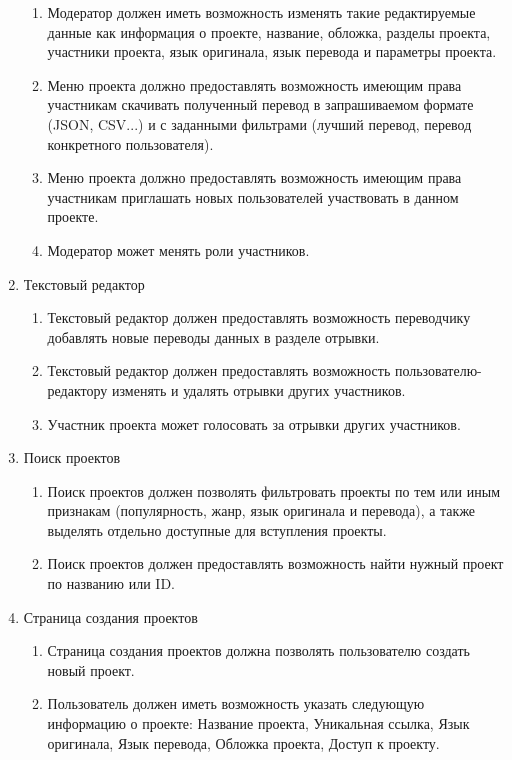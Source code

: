 \documentclass[a4paper,12pt]{article}
\begin{document}
\begin{enumerate}
\begin{enumerate}
	\item Модератор должен иметь возможность изменять такие редактируемые данные как информация о проекте, название, обложка, разделы проекта, участники проекта, язык оригинала, язык перевода и параметры проекта.
	\item Меню проекта должно предоставлять возможность имеющим права участникам скачивать полученный перевод в запрашиваемом формате (JSON, CSV...) и с заданными фильтрами (лучший перевод, перевод конкретного пользователя).
	\item Меню проекта должно предоставлять возможность имеющим права участникам приглашать новых пользователей участвовать в данном проекте.
	\item Модератор может менять роли участников.
\end{enumerate}
\item Текстовый редактор
\begin{enumerate}
	\item Текстовый редактор должен предоставлять возможность переводчику добавлять новые переводы данных в разделе отрывки.
	\item Текстовый редактор должен предоставлять возможность пользователю-редактору изменять и удалять отрывки других участников.
	\item Участник проекта может голосовать за отрывки других участников.
\end{enumerate}
\item Поиск проектов
\begin{enumerate}
	\item Поиск проектов должен позволять фильтровать проекты по тем или иным признакам (популярность, жанр, язык оригинала и перевода), а также выделять отдельно доступные для вступления проекты.
	\item Поиск проектов должен предоставлять возможность найти нужный проект по названию или ID.
\end{enumerate}
\item Страница создания проектов
\begin{enumerate}
	\item Страница создания проектов должна позволять пользователю создать новый проект.
	\item Пользователь должен иметь возможность указать следующую информацию о проекте: Название проекта, Уникальная ссылка, Язык оригинала, Язык перевода, Обложка проекта, Доступ к проекту.
\end{enumerate}
\end{enumerate}
\end{document}
